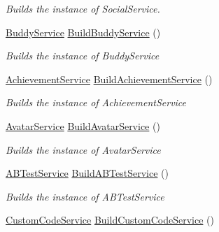 \begin{DoxyCompactItemize}
\begin{DoxyCompactList}\small\item\em Builds the instance of Social\+Service. \end{DoxyCompactList}\item 
\hyperlink{classcom_1_1shephertz_1_1app42_1_1paas_1_1sdk_1_1csharp_1_1buddy_1_1_buddy_service}{Buddy\+Service} \hyperlink{classcom_1_1shephertz_1_1app42_1_1paas_1_1sdk_1_1csharp_1_1_service_a_p_i_a67bfe47b87cc778b66f397a2e43a22c8}{Build\+Buddy\+Service} ()
\begin{DoxyCompactList}\small\item\em Builds the instance of Buddy\+Service \end{DoxyCompactList}\item 
\hyperlink{classcom_1_1shephertz_1_1app42_1_1paas_1_1sdk_1_1csharp_1_1achievement_1_1_achievement_service}{Achievement\+Service} \hyperlink{classcom_1_1shephertz_1_1app42_1_1paas_1_1sdk_1_1csharp_1_1_service_a_p_i_a64efccc81c55f1a2b4599859156ec6e5}{Build\+Achievement\+Service} ()
\begin{DoxyCompactList}\small\item\em Builds the instance of Achievement\+Service \end{DoxyCompactList}\item 
\hyperlink{classcom_1_1shephertz_1_1app42_1_1paas_1_1sdk_1_1csharp_1_1avatar_1_1_avatar_service}{Avatar\+Service} \hyperlink{classcom_1_1shephertz_1_1app42_1_1paas_1_1sdk_1_1csharp_1_1_service_a_p_i_a5ed1182d75cf0b447dd52a29c0710601}{Build\+Avatar\+Service} ()
\begin{DoxyCompactList}\small\item\em Builds the instance of Avatar\+Service \end{DoxyCompactList}\item 
\hyperlink{classcom_1_1shephertz_1_1app42_1_1paas_1_1sdk_1_1csharp_1_1ab_test_1_1_a_b_test_service}{A\+B\+Test\+Service} \hyperlink{classcom_1_1shephertz_1_1app42_1_1paas_1_1sdk_1_1csharp_1_1_service_a_p_i_ae30d7ca2639cb1f52ac85c5416f7ee50}{Build\+A\+B\+Test\+Service} ()
\begin{DoxyCompactList}\small\item\em Builds the instance of A\+B\+Test\+Service \end{DoxyCompactList}\item 
\hyperlink{classcom_1_1shephertz_1_1app42_1_1paas_1_1sdk_1_1csharp_1_1customcode_1_1_custom_code_service}{Custom\+Code\+Service} \hyperlink{classcom_1_1shephertz_1_1app42_1_1paas_1_1sdk_1_1csharp_1_1_service_a_p_i_abf7181365c20f73a693a1db63687719e}{Build\+Custom\+Code\+Service} ()

\end{DoxyCompactItemize}
